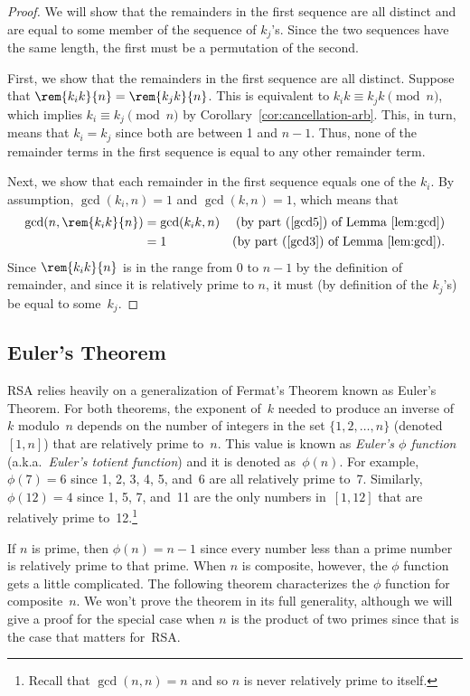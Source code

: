 \begin{proof}
We will show that the remainders in the first sequence are all
distinct and are equal to some member of the sequence of $k_j$'s.
Since the two sequences have the same length, the first must be a
permutation of the second.

First, we show that the remainders in the first sequence are all
distinct.  Suppose that $\rem{k_i k}{n} = \rem{k_j k}{n}$.  This is
equivalent to $k_i k \equiv k_j k \pmod{n}$, which implies $k_i \equiv
k_j \pmod{n}$ by Corollary~\ref{cor:cancellation-arb}.  This, in turn,
means that $k_i = k_j$ since both are between 1 and $n-1$.  Thus, none
of the remainder terms in the first sequence is equal to any other
remainder term.

Next, we show that each remainder in the first sequence equals one of
the $k_i$.  By assumption, $\gcd(k_i, n) = 1$ and $\gcd(k, n) = 1$,
which means that
%
\begin{align*}
\gcd(n, \rem{k_i k}{n}) & = \gcd(k_i k, n)
            & \text{(by part~(\ref{gcd5}) of Lemma~\ref{lem:gcd})}\\
      & = 1 & \text{(by part~(\ref{gcd3}) of Lemma~\ref{lem:gcd})}.
\end{align*}
%
Since $\rem{k_i k}{n}$ is in the range from 0 to $n - 1$ by the
definition of remainder, and since it is relatively prime to $n$, it
must (by definition of the $k_j$'s) be equal to some~$k_j$.
\end{proof}

\subsection{Euler's Theorem}

RSA relies heavily on a generalization of Fermat's Theorem known as
Euler's Theorem.  For both theorems, the exponent of~$k$ needed to
produce an inverse of~$k$ modulo~$n$ depends on the number of integers
in the set $\{1, 2, \dots, n \}$ (denoted $[1, n]$) that are
relatively prime to~$n$.
This value is known as \emph{Euler's $\phi$ function}
(a.k.a.\ \emph{Euler's totient function}) and it is denoted
as~$\phi(n)$.  For example, $\phi(7) = 6$ since 1, 2, 3, 4, 5, and~6
are all relatively prime to~7.  Similarly, $\phi(12) = 4$ since 1, 5,
7, and~11 are the only numbers in~$[1, 12]$ that are relatively prime
to~12.\footnote{Recall that $\gcd(n, n) = n$ and so $n$ is never
  relatively prime to itself.}

If $n$ is prime, then $\phi(n) = n - 1$ since every number less than a
prime number is relatively prime to that prime.  When $n$ is
composite, however, the $\phi$ function gets a little complicated.
The following theorem characterizes the $\phi$ function for
composite~$n$.  We won't prove the theorem in its full generality,
although we will give a proof for the special case when $n$ is the
product of two primes since that is the case that matters for~RSA.

